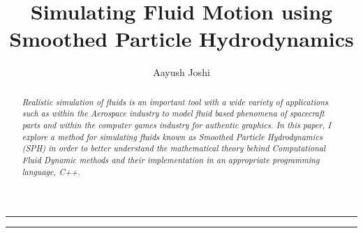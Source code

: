 \documentclass[a4paper,9pt]{article}
\title{\textbf{Simulating Fluid Motion using Smoothed Particle Hydrodynamics}}
\author{Aayush Joshi}
\date{}
\begin{document}
\maketitle

\par\noindent\rule{\textwidth}{0.3pt}

\begin{abstract}
\noindent \textit{Realistic simulation of fluids is an important tool with a wide variety of applications such as within the Aerospace industry to model fluid based phenomena of spacecraft parts and within the computer games industry for authentic graphics. In this paper, I explore a method for simulating fluids known as Smoothed Particle Hydrodynamics (SPH) in order to better understand the mathematical theory behind Computational Fluid Dynamic methods and their implementation in an appropriate programming language, C++.}
\end{abstract}

\par\noindent\rule{\textwidth}{0.3pt}
\tableofcontents
\newpage
\end{document}
